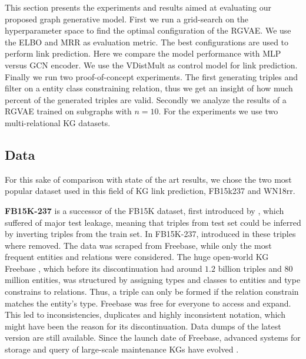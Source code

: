 
This section presents the experiments and results aimed at evaluating our proposed graph generative model. First we run a grid-search on the hyperparameter space to find the optimal configuration of the RGVAE. We use the ELBO and MRR as evaluation metric. The best configurations are used to perform link prediction. Here we compare the model performance with MLP versus GCN encoder. We use the VDistMult as control model for link prediction. Finally we run two proof-of-concept experiments. The first generating triples and filter on a entity class constraining relation, thus we get an insight of how much percent of the generated triples are valid. Secondly we analyze the results of a RGVAE trained on subgraphs with $n=10$. For the experiments we use two multi-relational KG datasets.



\subsection{Data}
\label{ssec5:data}
For this sake of comparison with state of the art results, we chose the two most popular dataset used in this field of KG link prediction, FB15k237 and WN18rr.


\textbf{FB15K-237} is a successor of the FB15K dataset, first introduced by \cite{bordes_translating_2013}, which suffered of major test leakage, meaning that triples from test set could be inferred by inverting triples from the train set. In FB15K-237, introduced in \cite{toutanova_representing_2015} these triples where removed.
The data was scraped from Freebase, while only the most frequent entities and relations were considered. The huge open-world KG Freebase \cite{bollacker_freebase_2008}, which before its discontinuation had around $1.2$ billion triples and $80$ million entities, was structured by assigning types and classes to entities and type constrains to relations. Thus, a triple can only be formed if the relation constrain matches the entity's type. Freebase was free for everyone to access and expand. This led to inconsistencies, duplicates and highly inconsistent notation, which might have been the reason for its discontinuation. Data dumps of the latest version are still available. Since the launch date of Freebase, advanced systems for storage and query of large-scale maintenance KGs have evolved \cite{cudre2013nosql}.






